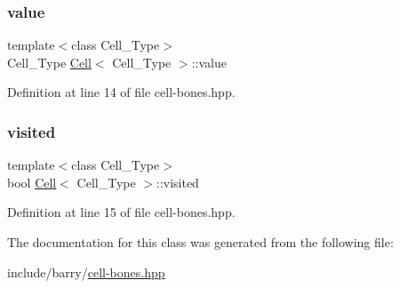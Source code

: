 \subsubsection{\texorpdfstring{value}{value}}
{\footnotesize\ttfamily template$<$class Cell\+\_\+\+Type$>$ \\
Cell\+\_\+\+Type \hyperlink{class_cell}{Cell}$<$ Cell\+\_\+\+Type $>$\+::value}



Definition at line 14 of file cell-\/bones.\+hpp.

\mbox{\label{class_cell_a1f539a05953fa05d723c32e718f0eeb3}} 
\subsubsection{\texorpdfstring{visited}{visited}}
{\footnotesize\ttfamily template$<$class Cell\+\_\+\+Type$>$ \\
bool \hyperlink{class_cell}{Cell}$<$ Cell\+\_\+\+Type $>$\+::visited}



Definition at line 15 of file cell-\/bones.\+hpp.



The documentation for this class was generated from the following file\+:\begin{DoxyCompactItemize}
\item 
include/barry/\hyperlink{cell-bones_8hpp}{cell-\/bones.\+hpp}\end{DoxyCompactItemize}
